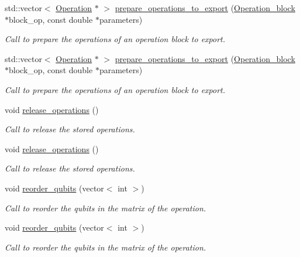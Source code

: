 \begin{DoxyCompactItemize}
std\+::vector$<$ \hyperlink{class_operation}{Operation} $\ast$ $>$ \hyperlink{class_decomposition___base_a267addf036c4207905f7f443aea471bb}{prepare\+\_\+operations\+\_\+to\+\_\+export} (\hyperlink{class_operation__block}{Operation\+\_\+block} $\ast$block\+\_\+op, const double $\ast$parameters)
\begin{DoxyCompactList}\small\item\em Call to prepare the operations of an operation block to export. \end{DoxyCompactList}\item 
std\+::vector$<$ \hyperlink{class_operation}{Operation} $\ast$ $>$ \hyperlink{class_decomposition___base_a9d4cf31a7409fcc6a74d6ed927839f15}{prepare\+\_\+operations\+\_\+to\+\_\+export} (\hyperlink{class_operation__block}{Operation\+\_\+block} $\ast$block\+\_\+op, const double $\ast$parameters)
\begin{DoxyCompactList}\small\item\em Call to prepare the operations of an operation block to export. \end{DoxyCompactList}\item 
void \hyperlink{class_operation__block_a7c3d4eadaef2f21f1c5dd9227faec7ce}{release\+\_\+operations} ()
\begin{DoxyCompactList}\small\item\em Call to release the stored operations. \end{DoxyCompactList}\item 
void \hyperlink{class_operation__block_a7c3d4eadaef2f21f1c5dd9227faec7ce}{release\+\_\+operations} ()
\begin{DoxyCompactList}\small\item\em Call to release the stored operations. \end{DoxyCompactList}\item 
void \hyperlink{class_operation__block_af2a71d29cdbce498e85f11b9ed81e0c9}{reorder\+\_\+qubits} (vector$<$ int $>$)
\begin{DoxyCompactList}\small\item\em Call to reorder the qubits in the matrix of the operation. \end{DoxyCompactList}\item 
void \hyperlink{class_operation__block_af2a71d29cdbce498e85f11b9ed81e0c9}{reorder\+\_\+qubits} (vector$<$ int $>$)
\begin{DoxyCompactList}\small\item\em Call to reorder the qubits in the matrix of the operation. \end{DoxyCompactList}\item 

\end{DoxyCompactItemize}
